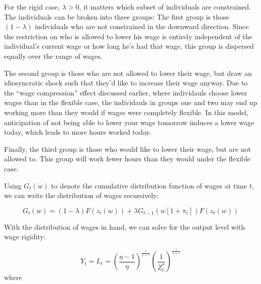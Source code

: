\documentclass[12pt,a4paper]{scrartcl}            %
\begin{document}
For the rigid case, $\lambda > 0$, it matters which subset of individuals are constrained.
The individuals can be broken into three groups:
The first group is those $(1-\lambda)$ individuals who are not constrained in the downward direction.
Since the restriction on who is allowed to lower his wage is entirely independent of the individual's current wage or how long he's had that wage, this group is dispersed equally over the range of wages.

The second group is those who are not allowed to lower their wage, but draw an idiosyncratic shock such that they'd like to increase their wage anyway.
Due to the ``wage compression'' effect discussed earlier, where individauls choose lower wages than in the flexible case, the individauls in groups one and two may end up working more than they would if wages were completely flexible.
In this model, anticipation of not being able to lower your wage tomorrow induces a lower wage today, which leads to more hours worked today.

Finally, the third group is those who would like to lower their wage, but are not allowed to.
This group will work fewer hours than they would under the flexible case.

Using $G_t(w)$ to denote the cumulative distribution function of wages at time $t$, we can write the distribution of wages recursively:

\begin{equation}
    \label{eq:wage_distribution}
    G_t(w) = (1 - \lambda) F(z_t(w)) + \lambda G_{t-1}\left(w[1 + \pi_t]\right)F(z_t(w))
\end{equation}

With the distribution of wages in hand, we can solve for the output level with wage rigidity:

\begin{equation}
    \label{eq:output_rigid}
    Y_t = L_t = \left(\frac{\eta - 1}{\eta} \right)^{\frac{\gamma}{1 + \gamma}}\left( \frac{1}{Z_t^*} \right)^{\frac{\gamma}{1 + \gamma}}
\end{equation}
%
where
\end{document}
